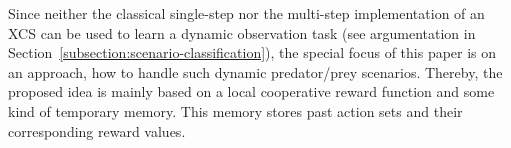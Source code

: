 Since neither the classical single-step nor the multi-step implementation of an XCS \cite{BW02} can be used to learn a dynamic observation task %
(see argumentation in Section~\ref{subsection:scenario-classification}), the special focus of this paper is on an approach, how to handle such dynamic predator/prey scenarios. Thereby, the proposed idea is mainly based on a local cooperative reward function and some kind of temporary memory. This memory stores past action sets and their corresponding reward values. %



